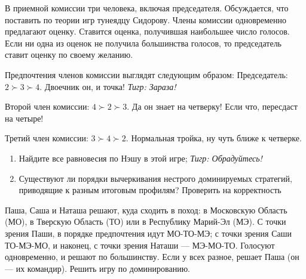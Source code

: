 \begin{problem} \par %
В приемной комиссии три человека, включая председателя. Обсуждается, что поставить по теории игр тунеядцу Сидорову. Члены комиссии одновременно предлагают оценку. Ставится оценка, получившая наибольшее число голосов. Если ни одна из оценок не получила большинства голосов, то председатель ставит оценку по своему желанию.\par
Предпочтения членов комиссии выглядят следующим образом:
Председатель:  $2\succ 3\succ 4$. Двоечник он, и точка! {\it Тигр: Зараза!}\par
Второй член комиссии:  $4\succ 2\succ 3$. Да он знает на четверку! Если что, пересдаст на четыре!\par
Третий член комиссии:  $3\succ 4\succ 2$. Нормальная тройка, ну чуть ближе к четверке.\par
\begin{enumerate}
\item	Найдите все равновесия по Нэшу в этой игре; {\it Тигр: Обрадуйтесь!}\par
\item	Существуют ли порядки вычеркивания нестрого доминируемых стратегий, приводящие к разным итоговым профилям? {\red Проверить на корректность}
\end{enumerate}
\begin{sol}

\end{sol}
\end{problem}

\begin{problem}
\begin{source}
\cite{savva:nmu}
\end{source}
Паша, Саша и Наташа решают, куда сходить в поход: в Московскую Область (МО), в Тверскую Область (ТО) или в Республику Марий-Эл (МЭ). С точки зрения Паши, в порядке предпочтения идут МО-ТО-МЭ; с точки зрения Саши ТО-МЭ-МО, и наконец, с точки зрения Наташи — МЭ-МО-ТО. Голосуют одновременно, и решают по большинству. Если у всех разное, решает Паша (он — их командир). Решить игру по доминированию.






\begin{sol}

\end{sol}
\end{problem}

